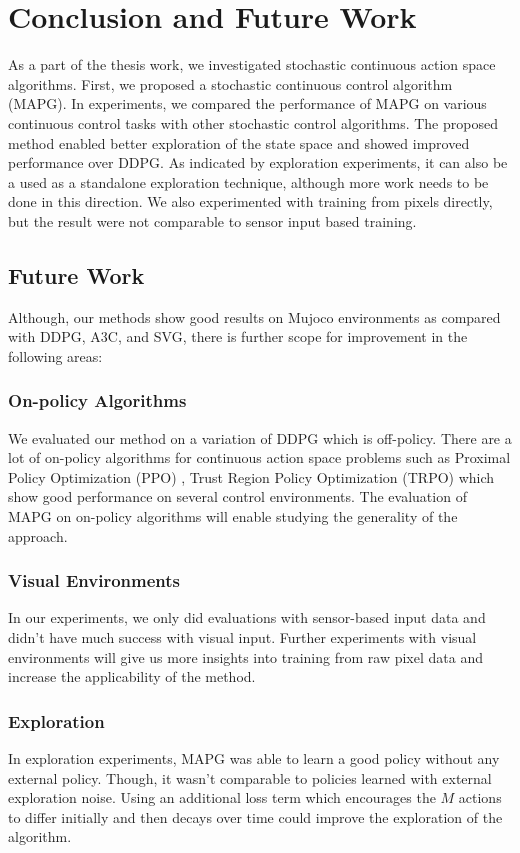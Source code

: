 \chapter{Conclusion and Future Work}\label{chapter:conclusion}

As a part of the thesis work, we investigated stochastic continuous action space algorithms. First, we proposed a stochastic continuous control algorithm (MAPG). In experiments, we compared the performance of MAPG on various continuous control tasks with other stochastic control algorithms. The proposed method enabled better exploration of the state space and showed improved performance over DDPG. As indicated by exploration experiments, it can also be a used as a standalone exploration technique, although more work needs to be done in this direction. We also experimented with training from pixels directly, but the result were not comparable to sensor input based training.

\section{Future Work}
Although, our methods show good results on Mujoco environments as compared with DDPG, A3C, and SVG, there is further scope for improvement in the following areas:

\subsection{On-policy Algorithms}
We evaluated our method on a variation of DDPG which is off-policy. There are a lot of on-policy algorithms for continuous action space problems such as Proximal Policy Optimization (PPO) \cite{SchulmanWDRK17}, Trust Region Policy Optimization (TRPO) which show good performance on several control environments. The evaluation of MAPG on on-policy algorithms will enable studying the generality of the approach.


\subsection{Visual Environments}
In our experiments, we only did evaluations with sensor-based input data and didn't have much success with visual input. Further experiments with visual environments will give us more insights into training from raw pixel data and increase the applicability of the method.

\subsection{Exploration}
In exploration experiments, MAPG was able to learn a good policy without any external policy. Though, it wasn't comparable to policies learned with external exploration noise. Using an additional loss term which encourages the $M$ actions to differ initially and then decays over time could improve the exploration of the algorithm.


